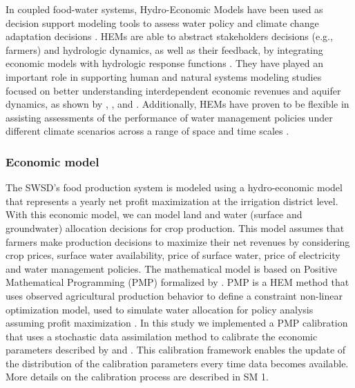 \documentclass[a4paper,fleqn]{cas-sc}
\begin{document}
In coupled food-water systems, Hydro-Economic Models have been used as decision support modeling tools to assess water policy and climate change adaptation decisions \citep{ward_hydroeconomic_2021,harou_hydro-economic_2009}. HEMs are able to abstract stakeholders decisions (e.g., farmers) and hydrologic dynamics, as well as their feedback, by integrating economic models with hydrologic response functions \citep{harou_hydro-economic_2009}. They have played an important role in supporting human and natural systems modeling studies focused on better understanding interdependent economic revenues and aquifer dynamics, as shown by \citet{macewan_hydroeconomic_2017}, \citet{afshar_multi-objective_2020}, \citet{graveline_combining_2020} and \citet{rodriguez-flores_global_2022}. Additionally, HEMs have proven to be flexible in assisting assessments of the performance of water management policies under different climate scenarios across a range of space and time scales \citep{partida_hydro-economic_2023}.

\subsubsection{Economic model}

The SWSD's food production system is modeled using a hydro-economic model \citep{harou_hydro-economic_2009} that represents a yearly net profit maximization at the irrigation district level. With this economic model, we can model land and water (surface and groundwater) allocation decisions for crop production. This model assumes that farmers make production decisions to maximize their net revenues by considering crop prices, surface water availability, price of surface water, price of electricity and water management policies. The mathematical model is based on Positive Mathematical Programming (PMP) formalized by \citet{howitt_calibration_1995}. PMP is a HEM method that uses observed agricultural production behavior to define a constraint non-linear optimization model, used to simulate water allocation for policy analysis assuming profit maximization \citep{graveline_combining_2020,macewan_hydroeconomic_2017,howitt_calibrating_2012,rodriguez-flores_insights_2019}. In this study we implemented a PMP calibration that uses a stochastic data assimilation method to calibrate the economic parameters described by \citet{maneta_stochastic_2014} and \citet{maneta_satellite-driven_2020}. This calibration framework enables the update of the distribution of the calibration parameters every time data becomes available. More details on the calibration process are described in SM 1. 
\end{document}
